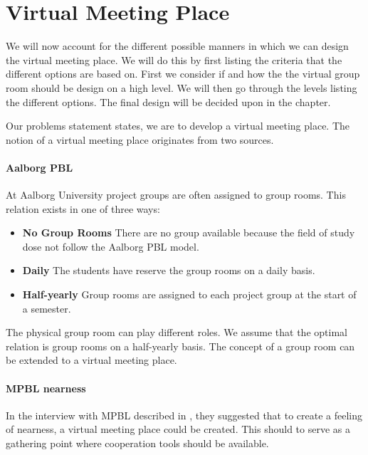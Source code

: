 \section{Virtual Meeting Place}
\label{sec:virtualMeetingPlace}

We will now account for the different possible manners in which we can design the virtual meeting place. We will do this by first listing the criteria that the different options are based on. First we consider if and how the the virtual group room should be design on a high level. We will then go through the levels listing the different options. The final design will be decided upon in the  chapter. 

Our problems statement states, we are to develop a virtual meeting place. 
The notion of a virtual meeting place originates from two sources.

\paragraph{Aalborg PBL} 
At Aalborg University project groups are often assigned to group rooms. This relation exists in one of three ways:
\begin{itemize}
	\item \textbf{No Group Rooms} There are no group available because the field of study dose not follow the Aalborg PBL model.
	\item \textbf{Daily} The students have reserve the group rooms on a daily basis.
	\item \textbf{Half-yearly} Group rooms are assigned to each project group at the start of a semester.
\end{itemize} 
The physical group room can play different roles. We assume that the optimal relation is group rooms on a half-yearly basis.
The concept of a group room can be extended to a virtual meeting place.    

\paragraph{MPBL nearness}
In the interview with MPBL described in \secref{}, they suggested that to create a feeling of nearness, a virtual meeting place could be created. This should to serve as a gathering point where cooperation tools should be available. \\


